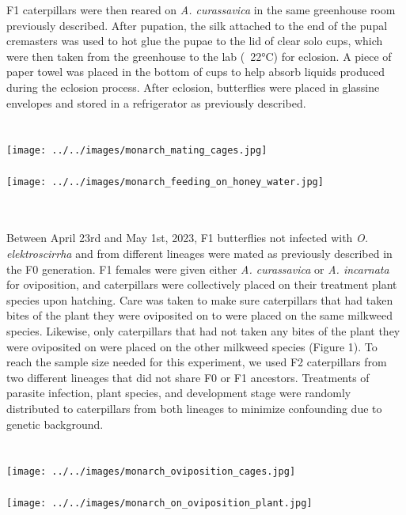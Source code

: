 \documentclass{article}
\begin{document}
\begin{multicols}{2}
    \indent F1 caterpillars were then reared on \emph{A. curassavica} in the same greenhouse room previously described. After pupation, the silk 
    attached to the end of the pupal cremasters was used to hot glue the pupae to the lid of clear solo cups, which were then taken from the 
    greenhouse to the lab (~22°C) for eclosion. A piece of paper towel was placed in the bottom of cups to help absorb liquids produced during 
    the eclosion process. After eclosion, butterflies were placed in glassine envelopes and stored in a refrigerator as previously described. 
    \\
    \\
    \\
    \texttt{[image: ../../images/monarch\_mating\_cages.jpg]} \\
    \\
    \texttt{[image: ../../images/monarch\_feeding\_on\_honey\_water.jpg]} \\
    \caption{\textbf{Figure 2.} Top: Monarch butterflies in mating cages. Image does not depict the actual cages used in this experiment.
                                Bottom: Monarch butterfly feeding on honey water from sponge in petri dish.
                                Images do not show actual butterflies used in this experiment.} \\
    \\
    \indent Between April 23rd and May 1st, 2023, F1 butterflies not infected with \emph{O. elektroscirrha} and from different lineages were mated as 
    previously described in the F0 generation. F1 females were given either \emph{A. curassavica} or \emph{A. incarnata} for oviposition, and caterpillars 
    were collectively placed on their treatment plant species upon hatching. Care was taken to make sure caterpillars that had taken bites of 
    the plant they were oviposited on to were placed on the same milkweed species. Likewise, only caterpillars that had not taken any bites of 
    the plant they were oviposited on were placed on the other milkweed species (Figure 1). To reach the sample size needed for this experiment, 
    we used F2 caterpillars from two different lineages that did not share F0 or F1 ancestors. Treatments of parasite infection, plant species, 
    and development stage were randomly distributed to caterpillars from both lineages to minimize confounding due to genetic background.
    \\
    \\
    \\
    \texttt{[image: ../../images/monarch\_oviposition\_cages.jpg]} \\
    \\
    \texttt{[image: ../../images/monarch\_on\_oviposition\_plant.jpg]} \\
    \caption{\textbf{Figure 3.} Top: Female monarch butterflies in cages with \emph{A. curassavica} for oviposition.
                                Bottom: Close-up of female monarch butterfly ovipositing on \emph{A. curassavica}.
                                Images do not show actual butterflies used in this experiment.} \\


\end{multicols}
\end{document}
